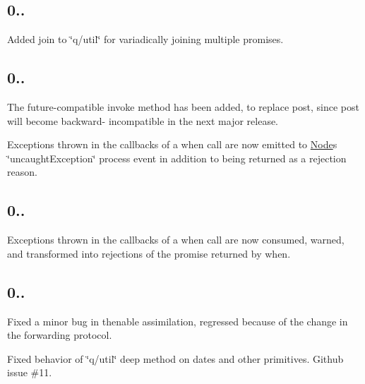 \subsection*{0..}


\begin{DoxyItemize}
\item Added {\ttfamily join} to {\ttfamily \char`\"{}q/util\char`\"{}} for variadically joining multiple promises.
\end{DoxyItemize}

\subsection*{0..}


\begin{DoxyItemize}
\item The future-\/compatible {\ttfamily invoke} method has been added, to replace {\ttfamily post}, since {\ttfamily post} will become backward-\/ incompatible in the next major release.
\item Exceptions thrown in the callbacks of a {\ttfamily when} call are now emitted to \mbox{\hyperlink{classNode}{Node}}\textquotesingle{}s {\ttfamily \char`\"{}uncaught\+Exception\char`\"{}} {\ttfamily process} event in addition to being returned as a rejection reason.
\end{DoxyItemize}

\subsection*{0..}


\begin{DoxyItemize}
\item Exceptions thrown in the callbacks of a {\ttfamily when} call are now consumed, warned, and transformed into rejections of the promise returned by {\ttfamily when}.
\end{DoxyItemize}

\subsection*{0..}


\begin{DoxyItemize}
\item Fixed a minor bug in thenable assimilation, regressed because of the change in the forwarding protocol.
\item Fixed behavior of \char`\"{}q/util\char`\"{} {\ttfamily deep} method on dates and other primitives. Github issue \#11.
\end{DoxyItemize}

